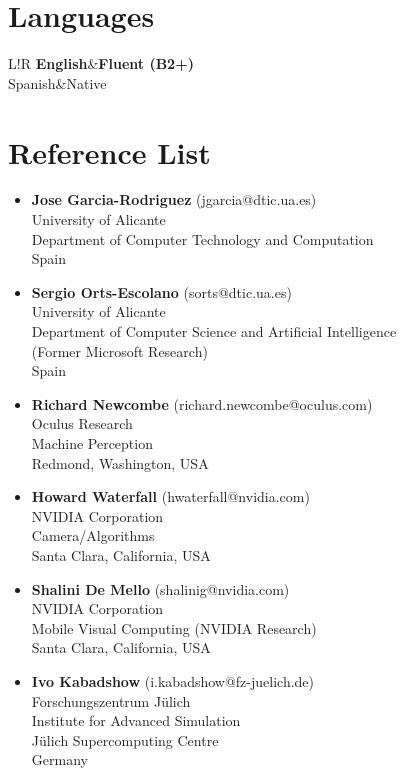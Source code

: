 \documentclass[8pt]{article}
\newcommand\VRule{\color{lightgray}\vrule width 0.5pt}
\begin{document}
\section*{Languages}
\begin{tabular}{L!{\VRule}R}
{\bf English}&{\bf Fluent (B2+)}\\
{Spanish}&{Native}\\
\end{tabular}

\section*{Reference List}
\begin{itemize}
	\item {\textbf{Jose Garcia-Rodriguez} (jgarcia@dtic.ua.es)\\
    University of Alicante\\
    Department of Computer Technology and Computation\\
    Spain\\}
	\item {\textbf{Sergio Orts-Escolano} (sorts@dtic.ua.es)\\
University of Alicante\\
		Department of Computer Science and Artificial Intelligence\\
		(Former Microsoft Research)\\
		Spain\\}

  \item {\textbf{Richard Newcombe} (richard.newcombe@oculus.com)\\
  Oculus Research\\
  Machine Perception\\
    Redmond, Washington, USA\\}

  \item {\textbf{Howard Waterfall} (hwaterfall@nvidia.com)\\
	NVIDIA Corporation\\
	Camera/Algorithms\\
	Santa Clara, California, USA\\}

  \item{\textbf{Shalini De Mello} (shalinig@nvidia.com)\\
	NVIDIA Corporation\\
	Mobile Visual Computing (NVIDIA Research)\\
	Santa Clara, California, USA\\}

  \item {\textbf{Ivo Kabadshow} (i.kabadshow@fz-juelich.de)\\
    Forschungszentrum Jülich\\
    Institute for Advanced Simulation\\
    Jülich Supercomputing Centre\\
    Germany\\}


\end{itemize}
 
\end{document}
